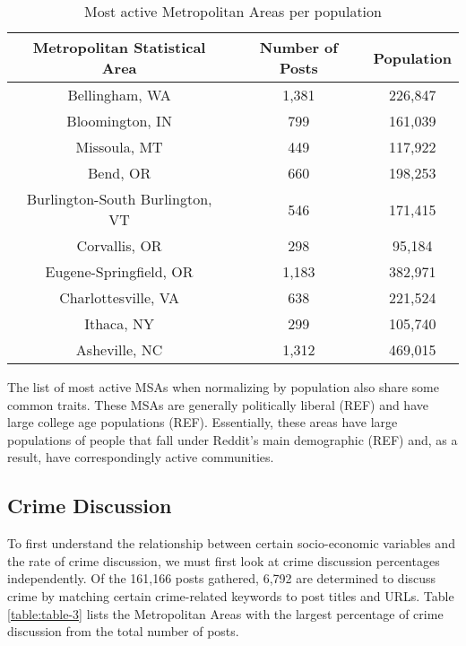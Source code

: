 \documentclass[12pt,oneside, letterpaper]{book}
\begin{document}
\begin{table}[h!]
    \centering
    \small
    \caption{Most active Metropolitan Areas per population}
    \begin{tabular}{| c | c | c |}
    \hline
    Metropolitan Statistical Area & Number of Posts & Population\\ \hline
    Bellingham, WA & 1,381 & 226,847 \\ \hline
    Bloomington, IN & 799 & 161,039 \\ \hline
    Missoula, MT & 449 & 117,922 \\ \hline
    Bend, OR & 660 & 198,253 \\ \hline
    Burlington-South Burlington, VT & 546 & 171,415 \\ \hline
    Corvallis, OR & 298 & 95,184 \\ \hline
    Eugene-Springfield, OR & 1,183 & 382,971 \\ \hline
    Charlottesville, VA & 638 & 221,524 \\ \hline
    Ithaca, NY & 299 & 105,740 \\ \hline
    Asheville, NC & 1,312 & 469,015 \\ \hline
	\end{tabular}
	\label{table:table-2}
\end{table}

\par The list of most active MSAs when normalizing by population also share some common traits. These MSAs are generally politically liberal (REF) and have large college age populations (REF). Essentially, these areas have large populations of people that fall under Reddit's main demographic (REF) and, as a result, have correspondingly active communities.

\subsection{Crime Discussion}

\par To first understand the relationship between certain socio-economic variables and the rate of crime discussion, we must first look at crime discussion percentages independently. Of the 161,166 posts gathered, 6,792 are determined to discuss crime by matching certain crime-related keywords to post titles and URLs. Table \ref{table:table-3} lists the Metropolitan Areas with the largest percentage of crime discussion from the total number of posts.
\end{document}
